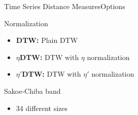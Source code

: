 \begin{frame}{Time Series Distance Measures}{Options}
    \begin{block}{Normalization}
        \begin{itemize}
            \item \textbf{DTW:} Plain DTW
            
            \item \textbf{$\eta$DTW:} DTW with $\eta$ normalization
            
            \item \textbf{$\eta '$DTW:} DTW with $\eta '$ normalization
            
        \end{itemize}
    \end{block}
    \begin{block}{Sakoe-Chiba band}
        \begin{itemize}
            \item 34 different sizes
        \end{itemize}
    \end{block}
\end{frame}
